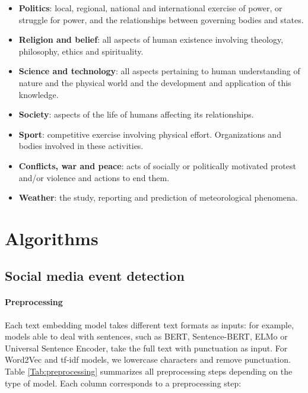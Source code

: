 \begin{itemize}
\item \textbf{Politics}: local, regional, national and international exercise of power, or struggle for power, and the relationships between governing bodies and states.
\item \textbf{Religion and belief}: all aspects of human existence involving theology, philosophy, ethics and spirituality.
\item \textbf{Science and technology}: all aspects pertaining to human understanding of nature and the physical world and the development and application of this knowledge.
\item \textbf{Society}: aspects of the life of humans affecting its relationships.
\item \textbf{Sport}: competitive exercise involving physical effort. Organizations and bodies involved in these activities.
\item \textbf{Conflicts, war and peace}: acts of socially or politically motivated protest and/or violence and actions to end them. 
\item \textbf{Weather}: the study, reporting and prediction of meteorological phenomena.
\end{itemize}                               



\clearpage 
\section{Algorithms\label{Sec:Algorithms}}


\subsection{Social media event detection\label{Sec:SME_algo}}

\paragraph{Preprocessing}
  
Each text embedding model takes different text formats as inputs: for example, models able to deal with sentences, such as BERT, Sentence-BERT, ELMo or Universal Sentence Encoder, take the full text with punctuation as input. For Word2Vec and tf-idf models, we lowercase characters and remove punctuation. Table \ref{Tab:preprocessing} summarizes all preprocessing steps depending on the type of model. Each column corresponds to a preprocessing step:

